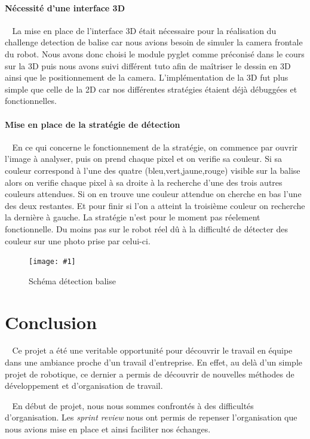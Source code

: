 \documentclass[12pt]{article}
\def\tab{$\>\>\>\>$}
\newcommand\img[2]{
\begin{figure}[!h]
  \centering
    \texttt{[image: \#1]}
  \caption{#2}
  \label{img:#1}
\end{figure}
}
\begin{document}
\paragraph{Nécessité d'une interface 3D \\}
\tab La mise en place de l'interface 3D était nécessaire pour la réalisation du challenge detection de balise car nous avions besoin de simuler la camera frontale du robot. Nous avons donc choisi le module pyglet comme préconisé dans le cours sur la 3D puis nous avons suivi différent tuto afin de maîtriser le dessin en 3D ainsi que le positionnement de la camera. L'implémentation de la 3D fut plus simple que celle de la 2D car nos différentes stratégies étaient déjà débuggées et fonctionnelles.

\paragraph{Mise en place de la stratégie de détection\\}
\tab En ce qui concerne le fonctionnement de la stratégie, on commence par ouvrir l'image à analyser, puis on prend chaque pixel et on verifie sa couleur. Si sa couleur correspond à l'une des quatre (bleu,vert,jaune,rouge) visible sur la balise alors on verifie chaque pixel à sa droite à la recherche d'une des trois autres couleurs attendues. Si on en trouve une couleur attendue on cherche en bas l'une des deux restantes. Et pour finir si l'on a atteint la troisième couleur on recherche la dernière à gauche. La stratégie n'est pour le moment pas réelement fonctionnelle. Du moins pas sur le robot réel dû à la difficulté de détecter des couleur sur une photo prise par celui-ci.

\img{Images/baliseschema.png}{Schéma détection balise}


\newpage

\section{Conclusion}
\tab Ce projet a été une veritable opportunité pour découvrir le travail en équipe dans une ambiance proche d'un travail d'entreprise. En effet, au delà d'un simple projet de robotique, ce dernier a permis de découvrir de nouvelles méthodes de développement et d'organisation de travail.

\tab En début de projet, nous nous sommes confrontés à des difficultés d'organisation. Les \textit{sprint review} nous ont permis de repenser l'organisation que nous avions mise en place et ainsi faciliter nos échanges.
\end{document}
